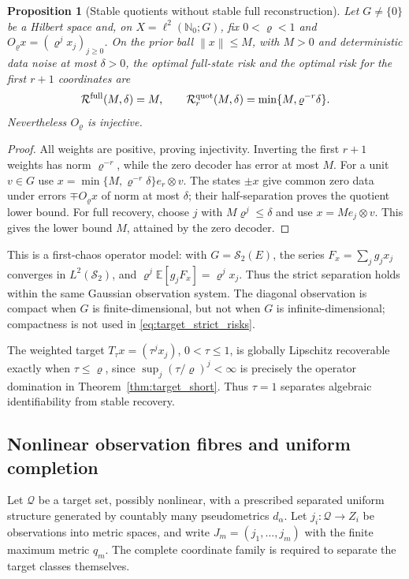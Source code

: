 \documentclass[11pt,a4paper]{amsart}
\numberwithin{equation}{section}
\newtheorem{proposition}[theorem]{Proposition}
\theoremstyle{definition}
\theoremstyle{remark}
\newcommand{\E}{\mathbb E}
\newcommand{\Sch}{\mathcal S}
\newcommand{\norm}[1]{\left\lVert#1\right\rVert}
\begin{document}
\begin{proposition}[Stable quotients without stable full reconstruction]\label{prop:target_strict_separation}
Let $G\ne\{0\}$ be a Hilbert space and, on $X=\ell^2(\mathbb N_0;G)$, fix $0<\varrho<1$ and
$O_\varrho x=(\varrho^jx_j)_{j\ge0}$. On the prior ball $\norm x\le M$, with $M>0$ and deterministic data noise at most $\delta>0$, the optimal full-state risk and the optimal risk for the first $r+1$ coordinates are
\begin{equation}\label{eq:target_strict_risks}
 \mathcal R^{\rm full}(M,\delta)=M,\qquad
 \mathcal R_r^{\rm quot}(M,\delta)=\min\{M,\varrho^{-r}\delta\}.
\end{equation}
Nevertheless $O_\varrho$ is injective.
\end{proposition}
\begin{proof}
All weights are positive, proving injectivity. Inverting the first $r+1$ weights has norm $\varrho^{-r}$, while the zero decoder has error at most $M$. For a unit $v\in G$ use
$x=\min\{M,\varrho^{-r}\delta\}e_r\otimes v$.
The states $\pm x$ give common zero data under errors $\mp O_\varrho x$ of norm at most $\delta$; their half-separation proves the quotient lower bound. For full recovery, choose $j$ with $M\varrho^j\le\delta$ and use $x=Me_j\otimes v$. This gives the lower bound $M$, attained by the zero decoder.
\end{proof}

This is a first-chaos operator model: with $G=\Sch_2(E)$, the series
$F_x=\sum_jg_jx_j$ converges in $L^2(\Sch_2)$, and
$\varrho^j\E[g_jF_x]=\varrho^jx_j$.
Thus the strict separation holds within the same Gaussian observation system. The diagonal observation is compact when $G$ is finite-dimensional, but not when $G$ is infinite-dimensional; compactness is not used in \eqref{eq:target_strict_risks}.

The weighted target $T_\tau x=(\tau^jx_j)$, $0<\tau\le1$, is globally Lipschitz recoverable exactly when $\tau\le\varrho$, since
$\sup_j(\tau/\varrho)^j<\infty$ is precisely the operator domination in Theorem~\ref{thm:target_short}. Thus $\tau=1$ separates algebraic identifiability from stable recovery.

\subsection{Nonlinear observation fibres and uniform completion}
Let $\mathcal Q$ be a target set, possibly nonlinear, with a prescribed separated uniform structure generated by countably many pseudometrics $d_\alpha$. Let $j_i:\mathcal Q\to Z_i$ be observations into metric spaces, and write $J_m=(j_1,\ldots,j_m)$ with the finite maximum metric $q_m$. The complete coordinate family is required to separate the target classes themselves.
\end{document}
